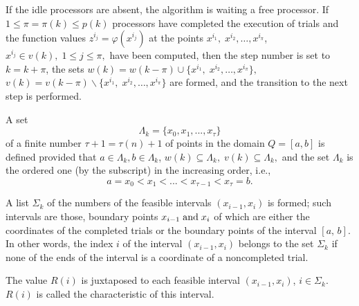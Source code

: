 	\begin{description} 
	\item[\textbf{Step 1.}] {If the idle processors are absent, the algorithm is waiting a free processor. If $1\le \pi =\pi (k)\le p(k)$ processors have completed the execution of trials and the function values $z^{i_{j} } =\varphi (x^{i_{j} } )$ at the points $x^{i_{1} } ,\; x^{i_{2} } ,\ldots ,x^{i_{\pi } } $, $x^{i_{j} } \in v(k),\; 1\le j\le \pi ,$ have been computed, then the step number is set to $k=k+\pi $, the sets $w(k)=w(k-\pi )\cup \{ x^{i_{1} } ,\; x^{i_{2} } ,\ldots ,x^{i_{\pi } } \} ,$ $v(k)=v(k-\pi )\backslash \{ x^{i_{1} } ,\; x^{i_{2} } ,\ldots ,x^{i_{\pi } } \} $ are formed, and the transition to the next step is performed.}
	\item [\textbf{Step 2.}]   {A set 
	\begin{equation*}
	\Lambda _{k} =\{ x_{0} ,x_{1} ,...,x_{\tau } \}
	\end{equation*}
	of a finite number $\tau +1=\tau (n)+1$ of points in the domain $Q=[a,b]$ is defined provided that $a\in \Lambda _k ,b\in \Lambda _k $, $w(k)\subseteq \Lambda _k ,\; v(k)\subseteq \Lambda _k ,$ and the set $\Lambda _k $ is the ordered one (by the subscript) in the increasing order, i.e.,
	\begin{equation*}
	a=x_0 <x_1 <...<x_{\tau -1} <x_{\tau } =b.
	\end{equation*}
	}
	\item [\textbf{Step 3.}] {A list $\Sigma _k$ of the numbers of the feasible intervals $(x_{i-1} ,x_i )$ is formed; such intervals are those, boundary points $x_{i-1} \; {\rm and}\; x_i $ of which are either the coordinates of the completed trials or the boundary points of the interval $[a,\, b]$. In other words, the index $i$ of the interval $(x_{i-1} ,x_i )$ belongs to the set $\Sigma _k $ if none of the ends of the interval is a coordinate of a noncompleted trial. }
	
	\item [\textbf{Step 4.}] {The value $R(i)$ is juxtaposed to each feasible interval $(x_{i-1} ,x_i )$, $i\in \Sigma _k $. $R(i)$ is called the characteristic of this interval. }
	

\end{description}

